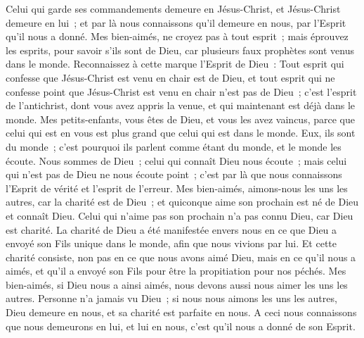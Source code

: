 \begin{multicols}{2}
Celui qui garde ses commandements demeure en Jésus-Christ, et Jésus-Christ demeure en lui~; et par là nous connaissons qu'il demeure en nous, par l'Esprit qu'il nous a donné.
\VerseOne{}Mes bien-aimés, ne croyez pas à tout esprit~; mais éprouvez les esprits, pour savoir s'ils sont de Dieu, car plusieurs faux prophètes sont venus dans le monde.
Reconnaissez à cette marque l'Esprit de Dieu~: Tout esprit qui confesse que Jésus-Christ est venu en chair est de Dieu,
et tout esprit qui ne confesse point que Jésus-Christ est venu en chair n'est pas de Dieu~; c'est l'esprit de l'antichrist, dont vous avez appris la venue, et qui maintenant est déjà dans le monde.
Mes petits-enfants, vous êtes de Dieu, et vous les avez vaincus, parce que celui qui est en vous est plus grand que celui qui est dans le monde.
Eux, ils sont du monde~; c'est pourquoi ils parlent comme étant du monde, et le monde les écoute.
Nous sommes de Dieu~; celui qui connaît Dieu nous écoute~; mais celui qui n'est pas de Dieu ne nous écoute point~; c'est par là que nous connaissons l'Esprit de vérité et l'esprit de l'erreur.
Mes bien-aimés, aimons-nous les uns les autres, car la charité est de Dieu~; et quiconque aime son prochain est né de Dieu et connaît Dieu.
Celui qui n'aime pas son prochain n'a pas connu Dieu, car Dieu est charité.
La charité de Dieu a été manifestée envers nous en ce que Dieu a envoyé son Fils unique dans le monde, afin que nous vivions par lui.
Et cette charité consiste, non pas en ce que nous avons aimé Dieu, mais en ce qu'il nous a aimés, et qu'il a envoyé son Fils pour être la propitiation pour nos péchés.
Mes bien-aimés, si Dieu nous a ainsi aimés, nous devons aussi nous aimer les uns les autres.
Personne n'a jamais vu Dieu~; si nous nous aimons les uns les autres, Dieu demeure en nous, et sa charité est parfaite en nous.
A ceci nous connaissons que nous demeurons en lui, et lui en nous, c'est qu'il nous a donné de son Esprit.

\end{multicols}
